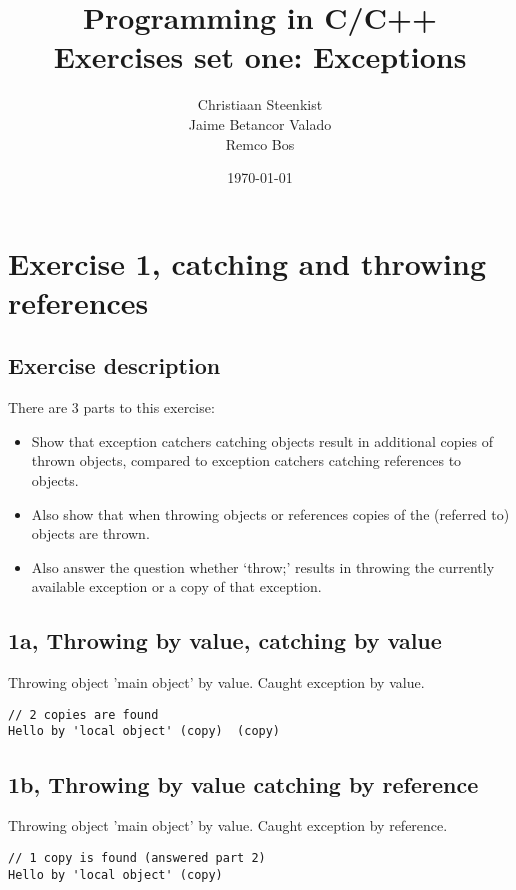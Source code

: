 \documentclass[11pt]{article}
\begin{document}
\title{Programming in C/C++ \\
       Exercises set one: Exceptions
}
\date{\today}
\author{Christiaan Steenkist \\
Jaime Betancor Valado \\
Remco Bos \\
}

\maketitle

\section*{Exercise 1, catching and throwing references}
\subsection*{Exercise description}
There are 3 parts to this exercise:
\begin{itemize}
\item Show that exception catchers catching objects result in additional copies of thrown objects, compared to exception catchers catching references to objects.
\item Also show that when throwing objects or references copies of the (referred to) objects are thrown.
\item Also answer the question whether `throw;' results in throwing the currently available exception or a copy of that exception. 
\end{itemize}

\subsection*{1a, Throwing by value, catching by value}
Throwing object 'main object' by value.
Caught exception by value.
\begin{lstlisting}
// 2 copies are found
Hello by 'local object' (copy)  (copy)
\end{lstlisting}

\subsection*{1b, Throwing by value catching by reference}
Throwing object 'main object' by value.
Caught exception by reference.
\begin{lstlisting}
// 1 copy is found (answered part 2)
Hello by 'local object' (copy)
\end{lstlisting}
\end{document}

